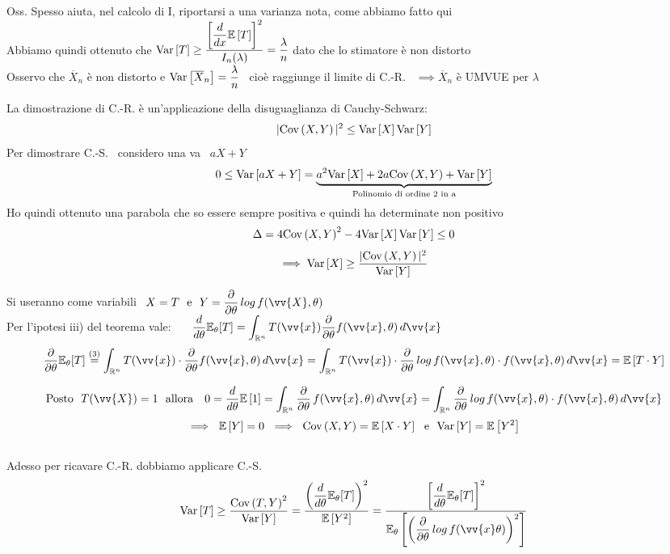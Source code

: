 Oss. Spesso aiuta, nel calcolo di I, riportarsi a una varianza nota, come abbiamo fatto qui\\

Abbiamo quindi ottenuto che $\text{Var} \left[ T \right]\ge\dfrac{\left[\dfrac{d}{dx}\mathbb{E} \left[ T \right]\right]^2}{I_n(\lambda)}=\dfrac{\lambda}{n}$ dato che lo stimatore è non distorto\\

Osservo che $\overline{X}_n$ è non distorto e $\text{Var} \left[ \overline{X}_n \right]=\dfrac{\lambda}{n}$ \ cioè raggiunge il limite di C.-R. \ $\implies \overline{X}_n$ è UMVUE per $\lambda$\\

\begin{Dim}
La dimostrazione di C.-R. è un'applicazione della disuguaglianza di Cauchy-Schwarz:
\[ |\cov{X}{Y}|^2 \le \var{X}\var{Y} \skipp\]
%
Per dimostrare C.-S. \ considero una va \ $aX+Y$
\[
0\le\text{Var} \left[ aX+Y \right]=\underset{\text{Polinomio di ordine 2 in a}}{\underbrace{a^2\text{Var} \left[ X \right]+2a\text{Cov} \left( X,Y \right)+\text{Var} \left[ Y \right]}}\]
Ho quindi ottenuto una parabola che so essere sempre positiva e quindi ha determinate non positivo 
\[\Delta=4\text{Cov} \left( X,Y \right)^2 -4\text{Var} \left[ X \right]\text{Var} \left[ Y \right]\le 0\]
\[\implies \text{Var} \left[ X \right]\ge\dfrac{|\text{Cov} \left( X,Y \right)|^2}{\text{Var} \left[ Y \right]} \]
\phantom{}

Si useranno come variabili \ $X=T \ \text{ e } \ Y=\frac{\partial}{\partial\theta}\,log\,f(\vv{X},\theta)$\\

Per l'ipotesi iii) del teorema vale: \ \  \ $ \frac{d}{d\theta}\EE_{\theta}[T] = \displaystyle\int_{\R^n}T(\vv{x})\frac{\partial}{\partial \theta}f(\vv{x},\theta)\,d\vv{x} $
\[
\frac{\partial}{\partial\theta}\EE_{\theta}[T]\overset{(3)}{=} \int_{\R^n}T(\vv{x})\cdot\frac{\partial}{\partial\theta}f(\vv{x},\theta)\,d\vv{x} = \int_{\R^n}T(\vv{x})\cdot\frac{\partial}{\partial\theta}\,log\,f(\vv{x},\theta)\cdot f(\vv{x},\theta)\, d\vv{x} = \E{T\cdot Y}\]
\phantom{}

\[\text{Posto \ } T(\vv{X})=1 \ \text{ allora \ } \ 0=\frac{d}{d\theta}\E{1}=\int_{\R^n}\frac{\partial}{\partial\theta}\,f(\vv{x},\theta)\,d\vv{x}=\int_{\R^n}\frac{\partial}{\partial\theta}\,log\,f(\vv{x},\theta)\cdot f(\vv{x},\theta)\,d\vv{x} \]
\[\implies \ \E{Y}=0 \ \implies \ \cov{X}{Y}=\E{X\cdot Y} \ \text{ e } \ \var{Y}=\E{Y^2}\]\\

Adesso per ricavare C.-R. dobbiamo applicare C.-S.\\
\[\var{T}\ge\frac{\cov{T}{Y}^2}{\var{Y}}=\frac{\O\frac{d}{d\theta}\EE_{\theta}[T]\C^2}{\E{Y^2}}=\frac{\OO\frac{d}{d\theta}\EE_{\theta}[T]\CC^2}{\EE_{\theta}\OO\O\frac{\partial}{\partial\theta}\,log\,f(\vv{x}\theta)\C^2\CC}\]
\end{Dim}




